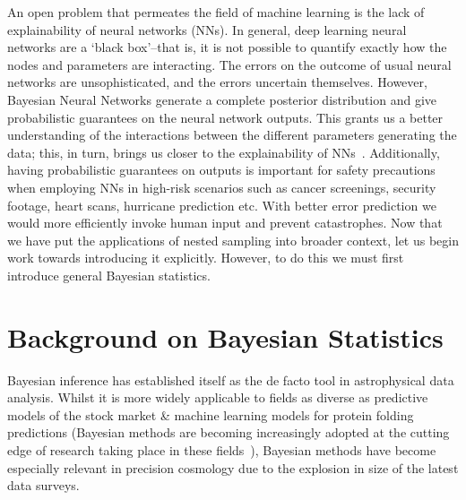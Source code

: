 An open problem that permeates the field of machine learning is the lack of explainability of neural networks (NNs). In general, deep learning neural networks are a `black box'--that is, it is not possible to quantify exactly how the nodes and parameters are interacting. The errors on the outcome of usual neural networks are unsophisticated, and the errors uncertain themselves. However, Bayesian Neural Networks generate a complete posterior distribution and give probabilistic guarantees on the neural network outputs. This grants us a better understanding of the interactions between the different parameters generating the data; this, in turn, brings us closer to the explainability of NNs~\cite{https://doi.org/10.48550/arxiv.1801.07710}. Additionally, having probabilistic guarantees on outputs is important for safety precautions when employing NNs in high-risk scenarios such as cancer screenings, security footage, heart scans, hurricane prediction etc. With better error prediction we would more efficiently invoke human input and prevent catastrophes. Now that we have put the applications of nested sampling into broader context, let us begin work towards introducing it explicitly. However, to do this we must first introduce general Bayesian statistics.


\section{Background on Bayesian Statistics} %

Bayesian inference has established itself as the de facto tool in astrophysical data analysis. Whilst it is more widely applicable to fields as diverse as predictive models of the stock market \& machine learning models for protein folding predictions (Bayesian methods are becoming increasingly adopted at the cutting edge of research taking place in these fields~\cite{https://doi.org/10.48550/arxiv.1010.4735, Ding2015DeepLF,neal_1996,MacKay1996,KristineBeck-2012}), Bayesian methods have become especially relevant in precision cosmology due to the explosion in size of the latest data surveys. 

